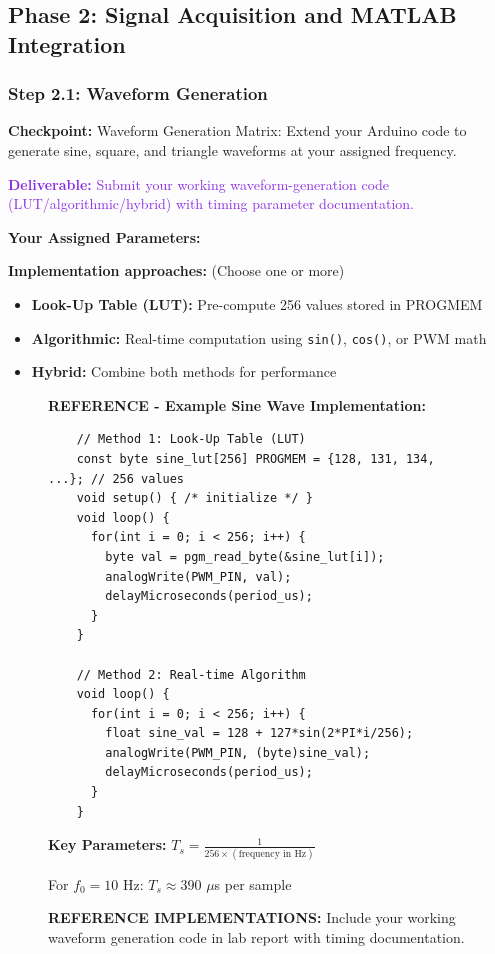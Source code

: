 \documentclass[11pt,letterpaper]{article}
\providecommand{\cpECE}[1]{\textcolor{OliveGreen}{\textbf{Checkpoint:} #1}}
\providecommand{\delECE}[1]{\textcolor{BlueViolet}{\textbf{Deliverable:} #1}}
\begin{document}
\subsection{Phase 2: Signal Acquisition and MATLAB Integration}

\subsubsection{Step 2.1: Waveform Generation}
\cpECE{Waveform Generation Matrix:} Extend your Arduino code to generate sine, square, and triangle waveforms at your assigned frequency.

\delECE{Submit your working waveform-generation code (LUT/algorithmic/hybrid) with timing parameter documentation.}

\textbf{Your Assigned Parameters:}

\textbf{Implementation approaches:} (Choose one or more)
\begin{itemize}
    \item \textbf{Look-Up Table (LUT):} Pre-compute 256 values stored in PROGMEM
    \item \textbf{Algorithmic:} Real-time computation using \texttt{sin()}, \texttt{cos()}, or PWM math
    \item \textbf{Hybrid:} Combine both methods for performance
\end{itemize}

\begin{figure}[H]
    \centering
    \vspace{0.5in}
    \textbf{REFERENCE - Example Sine Wave Implementation:}
    
    \begin{verbatim}
    // Method 1: Look-Up Table (LUT)
    const byte sine_lut[256] PROGMEM = {128, 131, 134, ...}; // 256 values
    void setup() { /* initialize */ }
    void loop() {
      for(int i = 0; i < 256; i++) {
        byte val = pgm_read_byte(&sine_lut[i]);
        analogWrite(PWM_PIN, val);
        delayMicroseconds(period_us);
      }
    }
    
    // Method 2: Real-time Algorithm
    void loop() {
      for(int i = 0; i < 256; i++) {
        float sine_val = 128 + 127*sin(2*PI*i/256);
        analogWrite(PWM_PIN, (byte)sine_val);
        delayMicroseconds(period_us);
      }
    }
    \end{verbatim}
    
    \vspace{0.3in}
    \textbf{Key Parameters:} $T_s = \frac{1}{256 \times (\text{frequency in Hz})}$
    
    For $f_0 = 10$ Hz: $T_s \approx 390$ $\mu$s per sample
    
    \vspace{0.3in}
    \caption{\textbf{REFERENCE IMPLEMENTATIONS:} Include your working waveform generation code in lab report with timing documentation.}
    \label{fig:code_snippet}
\end{figure}
\end{document}
